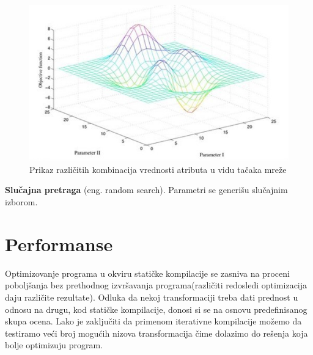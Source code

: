 \documentclass[a4paper]{article}
\begin{document}
\begin{figure}[h]
\includegraphics[scale=0.75]{grid.png}
\caption{Prikaz različitih kombinacija vrednosti atributa u vidu tačaka mreže}
\label{fig:slika1}
\end{figure}

\textbf{Slučajna pretraga} (eng. random search). Parametri se generišu slučajnim izborom.

\section{Performanse}
\label{sec:performanse}
Optimizovanje programa u okviru statičke kompilacije se zasniva na proceni poboljšanja 
bez prethodnog izvršavanja programa(različiti redosledi optimizacija daju različite rezultate). 
Odluka da nekoj transformaciji treba dati prednost u odnosu na drugu, kod statičke kompilacije,
donosi si se na osnovu predefinisanog skupa ocena. Lako je zaključiti da primenom iterativne kompilacije 
možemo da testiramo veći broj mogućih nizova transformacija čime dolazimo do rešenja koja bolje optimizuju
program.
\end{document}
